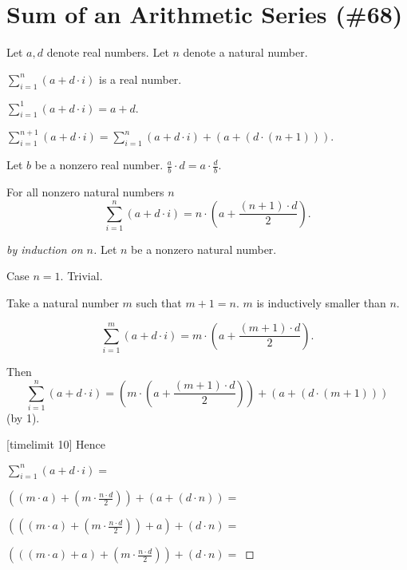 \documentclass{article}
\begin{document}
\section{Sum of an Arithmetic Series (\#68)}

\newcommand{\sumarith}[3]{\sum_{i = 1}^{#3}(#1 + #2 \cdot i)}

\begin{forthel}
Let $a,d$ denote real numbers.
Let $n$ denote a natural number.

\begin{signature}
$\sumarith{a}{d}{n}$ is a real number.
\end{signature}

\begin{axiom}
$\sumarith{a}{d}{1} = a + d$.
\end{axiom}

\begin{axiom}[1]
$\sumarith{a}{d}{n+1} = \sumarith{a}{d}{n} + (a + (d \cdot (n + 1)))$.
\end{axiom}

\begin{lemma}
Let $b$ be a nonzero real number.
$\frac{a}{b} \cdot d = a \cdot \frac{d}{b}$.
\end{lemma}

\begin{theorem} For all nonzero natural numbers $n$
$$\sumarith{a}{d}{n} = n \cdot ( a + \frac{(n + 1) \cdot d}{2}).$$
\end{theorem}
\begin{proof}[by induction on $n$]
Let $n$ be a nonzero natural number.

Case $n = 1$.
Trivial.

Take a natural number $m$ such that $m + 1 = n$. $m$ is inductively smaller than $n$.

$$\sumarith{a}{d}{m} = m \cdot ( a + \frac{(m + 1) \cdot d}{2}).$$

Then
$$\sumarith{a}{d}{n} =
(m \cdot ( a + \frac{(m + 1) \cdot d}{2})) + (a + (d \cdot (m + 1)))$$
(by 1).


[timelimit 10]
Hence

$\sumarith{a}{d}{n} =$

$((m \cdot a) + (m \cdot \frac{n \cdot d}{2})) + (a + (d \cdot n)) =$

$(((m \cdot a) + (m \cdot \frac{n \cdot d}{2})) + a) + (d \cdot n) =$

$(((m \cdot a) + a) +  (m \cdot \frac{n \cdot d}{2})) + (d \cdot n) =$


\end{proof}
\end{forthel}
\end{document}
